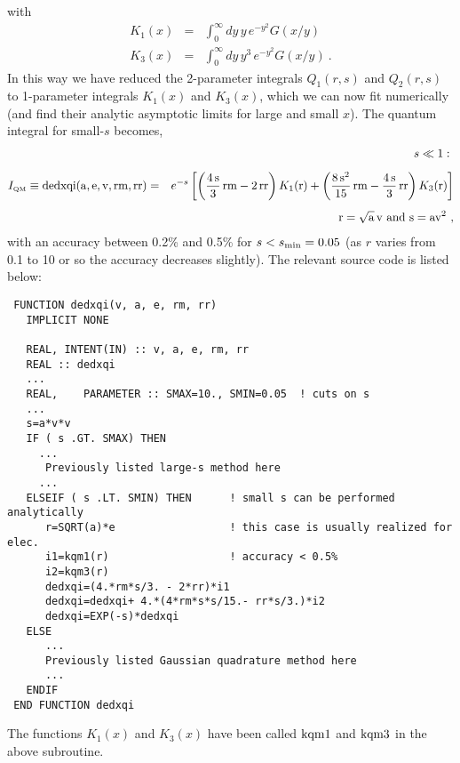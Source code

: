 \documentclass[preprint,12pt,eqsecnum,nofootinbib,amsmath,amssymb]{revtex4}
\newcommand{\smQM}{{\rm\scriptscriptstyle QM}}
\begin{document}
with 
\begin{eqnarray}
  K_1(x) &=& \int_0^\infty dy \, y\, e^{-y^2} G(x/y)
\\[5pt]
  K_3(x) &=& \int_0^\infty dy \, y^3\, e^{-y^2} G(x/y) \ .
\end{eqnarray}
In this way we have reduced the 2-parameter integrals 
$Q_1(r,s)$ and $Q_2(r,s)$
to 1-parameter integrals $K_1(x)$ and $K_3(x)$, which 
we can now fit numerically (and find their analytic 
asymptotic limits for large and small $x$). The quantum 
integral for small-$s$ becomes, 
\begin{eqnarray}
   && \hskip-5.4cm   s \ll 1 : ~
\\[5pt]
\nonumber
  I_\smQM \equiv 
  {\rm dedxqi}({\rm a},{\rm e},{\rm v},{\rm rm},{\rm rr})    
  &=& 
  e^{-s}\left[
  \left( \frac{4\,{\rm s}}{3}\,{\rm rm} - 2\,{\rm rr}
  \right) K_1({\rm r}) +
  \left( \frac{8\,{\rm s}^2}{15}\,{\rm rm} - \frac{4\,
  {\rm s}}{3}\,{\rm rr}\right) K_3({\rm r})
  \right] 
\\[5pt]
\nonumber &&
  {\rm r} = {\rm \sqrt{a}}\,{\rm v} {\rm ~and~} {\rm s}= {\rm a} 
  {\rm v}^2 \ ,
\end{eqnarray}
with an accuracy between 0.2\% and 0.5\% for $s < s_{\rm min}=
0.05$ (as $r$ varies from 0.1 to 10 or so the accuracy 
decreases slightly). The relevant source code is listed 
below:


{
\baselineskip12pt
\begin{verbatim}
 FUNCTION dedxqi(v, a, e, rm, rr)
   IMPLICIT NONE     
  
   REAL, INTENT(IN) :: v, a, e, rm, rr
   REAL :: dedxqi
   ...  
   REAL,    PARAMETER :: SMAX=10., SMIN=0.05  ! cuts on s
   ...
   s=a*v*v
   IF ( s .GT. SMAX) THEN          
     ...
      Previously listed large-s method here
     ...
   ELSEIF ( s .LT. SMIN) THEN      ! small s can be performed analytically
      r=SQRT(a)*e                  ! this case is usually realized for elec.
      i1=kqm1(r)                   ! accuracy < 0.5%
      i2=kqm3(r)
      dedxqi=(4.*rm*s/3. - 2*rr)*i1
      dedxqi=dedxqi+ 4.*(4*rm*s*s/15.- rr*s/3.)*i2   
      dedxqi=EXP(-s)*dedxqi
   ELSE                            
      ...
      Previously listed Gaussian quadrature method here
      ...
   ENDIF
 END FUNCTION dedxqi
\end{verbatim}
}

\noindent
The functions $K_1(x)$ and $K_3(x)$ have been called 
${\rm kqm1}$ and ${\rm kqm3}$ in the above subroutine.

\pagebreak
\end{document}
